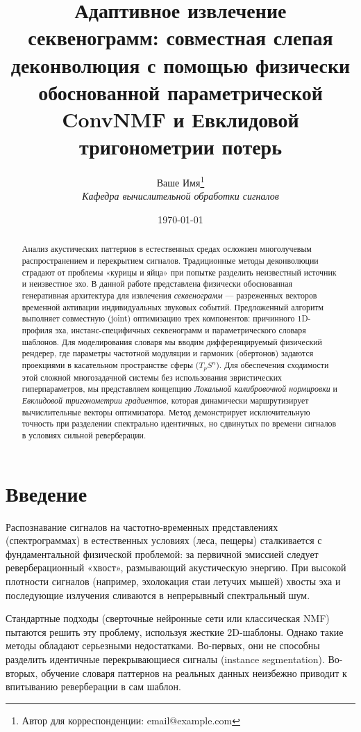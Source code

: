 \documentclass[11pt,a4paper]{article}
\title{\textbf{Адаптивное извлечение секвенограмм: совместная слепая деконволюция с помощью физически обоснованной параметрической ConvNMF и Евклидовой тригонометрии потерь}}
\author{Ваше Имя\thanks{Автор для корреспонденции: email@example.com} \\ 
        \small \textit{Кафедра вычислительной обработки сигналов}}
\date{\today}
\begin{document}
\maketitle

\begin{abstract}
Анализ акустических паттернов в естественных средах осложнен многолучевым распространением и перекрытием сигналов. Традиционные методы деконволюции страдают от проблемы «курицы и яйца» при попытке разделить неизвестный источник и неизвестное эхо. В данной работе представлена физически обоснованная генеративная архитектура для извлечения \textit{секвенограмм} — разреженных векторов временной активации индивидуальных звуковых событий. Предложенный алгоритм выполняет совместную (joint) оптимизацию трех компонентов: причинного 1D-профиля эха, инстанс-специфичных секвенограмм и параметрического словаря шаблонов. Для моделирования словаря мы вводим дифференцируемый физический рендерер, где параметры частотной модуляции и гармоник (обертонов) задаются проекциями в касательном пространстве сферы ($T_p S^n$). Для обеспечения сходимости этой сложной многозадачной системы без использования эвристических гиперпараметров, мы представляем концепцию \textit{Локальной калибровочной нормировки} и \textit{Евклидовой тригонометрии градиентов}, которая динамически маршрутизирует вычислительные векторы оптимизатора. Метод демонстрирует исключительную точность при разделении спектрально идентичных, но сдвинутых по времени сигналов в условиях сильной реверберации.
\end{abstract}

\section{Введение}
Распознавание сигналов на частотно-временных представлениях (спектрограммах) в естественных условиях (леса, пещеры) сталкивается с фундаментальной физической проблемой: за первичной эмиссией следует реверберационный «хвост», размывающий акустическую энергию. При высокой плотности сигналов (например, эхолокация стаи летучих мышей) хвосты эха и последующие излучения сливаются в непрерывный спектральный шум.

Стандартные подходы (сверточные нейронные сети или классическая NMF) пытаются решить эту проблему, используя жесткие 2D-шаблоны. Однако такие методы обладают серьезными недостатками. Во-первых, они не способны разделить идентичные перекрывающиеся сигналы (instance segmentation). Во-вторых, обучение словаря паттернов на реальных данных неизбежно приводит к впитыванию реверберации в сам шаблон.
\end{document}
